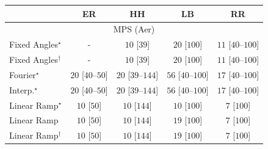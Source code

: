 \begin{tabular}{l|cccc|}
\toprule
            & ER & HH & LB & RR \\
\midrule
\multicolumn{5}{c}{\rule{0pt}{8pt}MPS (Aer)} \\
\midrule
Fixed Angles$^\star$ & {\cellcolor[HTML]{000000}} \color[HTML]{F1F1F1} {\cellcolor{white}} \color{black} - & {\cellcolor[HTML]{F7FCF5}} \color[HTML]{000000} $10$ [$39$] & {\cellcolor[HTML]{F5FBF2}} \color[HTML]{000000} $20$ [$100$] & {\cellcolor[HTML]{F6FCF4}} \color[HTML]{000000} $11$ [$40$--$100$] \\
Fixed Angles$^\dagger$ & {\cellcolor[HTML]{000000}} \color[HTML]{F1F1F1} {\cellcolor{white}} \color{black} - & {\cellcolor[HTML]{F7FCF5}} \color[HTML]{000000} $10$ [$39$] & {\cellcolor[HTML]{F5FBF2}} \color[HTML]{000000} $20$ [$100$] & {\cellcolor[HTML]{F6FCF4}} \color[HTML]{000000} $11$ [$40$--$100$] \\
Fourier$^\star$ & {\cellcolor[HTML]{F5FBF2}} \color[HTML]{000000} $20$ [$40$--$50$] & {\cellcolor[HTML]{F5FBF2}} \color[HTML]{000000} $20$ [$39$--$144$] & {\cellcolor[HTML]{EEF8EA}} \color[HTML]{000000} $56$ [$40$--$100$] & {\cellcolor[HTML]{F5FBF3}} \color[HTML]{000000} $17$ [$40$--$100$] \\
Interp.$^\star$ & {\cellcolor[HTML]{F5FBF2}} \color[HTML]{000000} $20$ [$40$--$50$] & {\cellcolor[HTML]{F5FBF2}} \color[HTML]{000000} $20$ [$39$--$144$] & {\cellcolor[HTML]{EEF8EA}} \color[HTML]{000000} $56$ [$40$--$100$] & {\cellcolor[HTML]{F5FBF3}} \color[HTML]{000000} $17$ [$40$--$100$] \\
Linear Ramp$^\star$ & {\cellcolor[HTML]{F7FCF5}} \color[HTML]{000000} $10$ [$50$] & {\cellcolor[HTML]{F7FCF5}} \color[HTML]{000000} $10$ [$144$] & {\cellcolor[HTML]{F7FCF5}} \color[HTML]{000000} $10$ [$100$] & {\cellcolor[HTML]{F7FCF5}} \color[HTML]{000000} $7$ [$100$] \\
Linear Ramp & {\cellcolor[HTML]{F7FCF5}} \color[HTML]{000000} $10$ [$50$] & {\cellcolor[HTML]{F7FCF5}} \color[HTML]{000000} $10$ [$144$] & {\cellcolor[HTML]{F5FBF3}} \color[HTML]{000000} $19$ [$100$] & {\cellcolor[HTML]{F7FCF5}} \color[HTML]{000000} $7$ [$100$] \\
Linear Ramp$^\dagger$ & {\cellcolor[HTML]{F7FCF5}} \color[HTML]{000000} $10$ [$50$] & {\cellcolor[HTML]{F7FCF5}} \color[HTML]{000000} $10$ [$144$] & {\cellcolor[HTML]{F5FBF3}} \color[HTML]{000000} $19$ [$100$] & {\cellcolor[HTML]{F7FCF5}} \color[HTML]{000000} $7$ [$100$] \\

\end{tabular}
